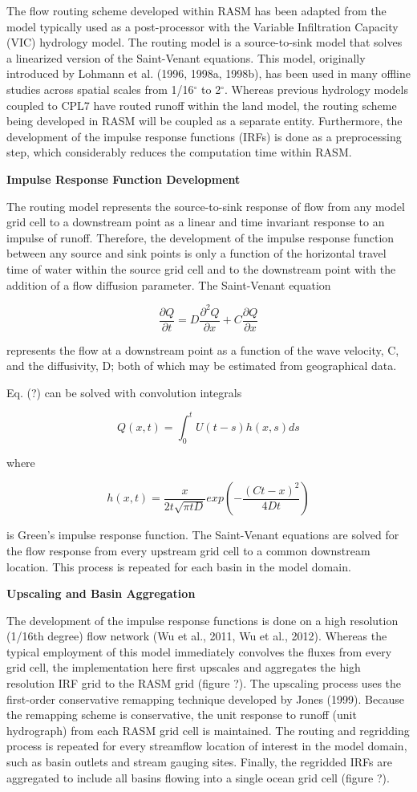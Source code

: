 The flow routing scheme developed within RASM has been adapted from the model typically used as a post-processor with the Variable Infiltration Capacity (VIC) hydrology model.
The routing model is a source-to-sink model that solves a linearized version of the Saint-Venant equations.
This model, originally introduced by Lohmann et al. (1996, 1998a, 1998b), has been used in many offline studies across spatial scales from 1/16$^{\circ}$ to 2$^{\circ}$.
Whereas previous hydrology models coupled to CPL7 have routed runoff within the land model, the routing scheme being developed in RASM will be coupled as a separate entity. 
Furthermore, the development of the impulse response functions (IRFs) is done as a preprocessing step, which considerably reduces the computation time within RASM.

\textbf{Impulse Response Function Development}

The routing model represents the source-to-sink response of flow from any model grid cell to a downstream point as a linear and time invariant response to an impulse of runoff.
Therefore, the development of the impulse response function between any source and sink points is only a function of the horizontal travel time of water within the source grid cell and to the downstream point with the addition of a flow diffusion parameter.
The Saint-Venant equation

\[ \frac{\partial Q}{\partial t} = D \frac{\partial^2 Q}{\partial x} + C \frac{\partial Q}{\partial x}\]

represents the flow at a downstream point as a function of the wave velocity, C, and the diffusivity, D; both of which may be estimated from geographical data.

Eq. (?) can be solved with convolution integrals

\[ Q(x,t) = \int_0^t U(t-s)h(x,s)ds \]

where

\[ h(x, t) = \frac{x}{2t\sqrt{\pi tD}}exp\left(-\frac{(Ct-x)^2}{4Dt}\right) \]

is Green’s impulse response function.
The Saint-Venant equations are solved for the flow response from every upstream grid cell to a common downstream location.  
This process is repeated for each basin in the model domain.

\textbf{Upscaling and Basin Aggregation}

The development of the impulse response functions is done on a high resolution (1/16th degree) flow network (Wu et al., 2011, Wu et al., 2012).
Whereas the typical employment of this model immediately convolves the fluxes from every grid cell, the implementation here first upscales and aggregates the high resolution IRF grid to the RASM grid (figure ?).
The upscaling process uses the first-order conservative remapping technique developed by Jones (1999).
Because the remapping scheme is conservative, the unit response to runoff (unit hydrograph) from each RASM grid cell is maintained.
The routing and regridding process is repeated for every streamflow location of interest in the model domain, such as basin outlets and stream gauging sites.
Finally, the regridded IRFs are aggregated to include all basins flowing into a single ocean grid cell (figure ?).


